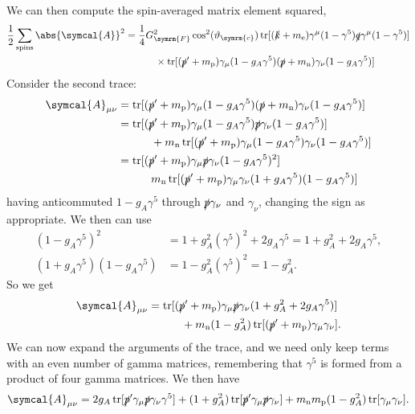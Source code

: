 \documentclass[fleqn]{NotesClass}
\newcommand{\Pparticle}[1]{\mathrm{#1}}
\newcommand{\Pex}{\ensuremath{\Pparticle{e}}}
\newcommand{\Pp}{\ensuremath{\Pparticle{p}}}
\newcommand{\Pn}{\ensuremath{\Pparticle{n}}}
\newcommand{\amplitude}{\symcal{A}}
\DeclareMathOperator{\tr}{tr}
\newcommand{\fermiConst}{G_{\symrm{F}}}
\newcommand{\cabibboangle}{\vartheta_{\symrm{c}}}
\begin{document}
    We can then compute the spin-averaged matrix element squared,
    \begin{align}
        \frac{1}{2} \sum_{\text{spins}} \abs{\amplitude}^2 &= \frac{1}{4}\fermiConst^2\cos^2(\cabibboangle) \tr[(\slashed{k} + m_{\Pex})\gamma^\mu(1 - \gamma^5)\slashed{q}\gamma^\mu(1 - \gamma^5)]\\
        &\quad\qquad \times \tr[(\slashed{p}' + m_{\Pp})\gamma_\mu(1 - g_A\gamma^5)(\slashed{p} + m_{\Pn})\gamma_\nu(1 - g_A\gamma^5)] \notag
    \end{align}
    Consider the second trace:
    \begin{align}
        \amplitude_{\mu\nu} &= \tr[(\slashed{p}' + m_{\Pp})\gamma_\mu(1 - g_A\gamma^5)(\slashed{p} + m_{\Pn})\gamma_\nu(1 - g_A\gamma^5)]\\
        &= \tr[(\slashed{p}' + m_{\Pp})\gamma_\mu(1 - g_A\gamma^5)\slashed{p}\gamma_\nu(1 - g_A\gamma^5)]\\
        &\quad\qquad + m_{\Pn}\tr[(\slashed{p}' + m_{\Pp})\gamma_\mu(1 - g_A\gamma^5)\gamma_\nu(1 - g_A\gamma^5)]\\
        &= \tr[(\slashed{p}' + m_{\Pp})\gamma_\mu\slashed{p}\gamma_\nu(1 - g_A\gamma^5)^2]\\
        &\quad\qquad m_{\Pn}\tr[(\slashed{p}' + m_{\Pp})\gamma_\mu\gamma_\nu(1 + g_A\gamma^5)(1 - g_A\gamma^5)]
    \end{align}
    having anticommuted \(1 - g_A\gamma^5\) through \(\slashed{p}\gamma_\nu\) and \(\gamma_\nu\), changing the sign as appropriate.
    We then can use
    \begin{align}
        (1 - g_A\gamma^5)^2 &= 1 + g_A^2(\gamma^5)^2 + 2g_A\gamma^5 = 1 + g_A^2 + 2g_A\gamma^5,\\
        (1 + g_A\gamma^5)(1 - g_A\gamma^5) &= 1 - g_A^2(\gamma^5)^2 = 1 - g_A^2.
    \end{align}
    So we get
    \begin{align}
        \amplitude_{\mu\nu} &= \tr[(\slashed{p}' + m_{\Pp})\gamma_\mu\slashed{p}\gamma_\nu(1 + g_A^2 + 2g_A\gamma^5)]\\
        &\quad\qquad + m_{\Pn}(1 - g_A^2)\tr[(\slashed{p}' + m_{\Pp})\gamma_\mu\gamma_\nu].
    \end{align}
    We can now expand the arguments of the trace, and we need only keep terms with an even number of gamma matrices, remembering that \(\gamma^5\) is formed from a product of four gamma matrices.
    We then have
    \begin{equation*}
        \amplitude_{\mu\nu} = 2g_A\tr[\slashed{p}'\gamma_\mu\slashed{p}\gamma_\nu\gamma^5] + (1 + g_A^2)\tr[\slashed{p}'\gamma_\mu\slashed{p}\gamma_\nu] + m_{\Pn}m_{\Pp}(1 - g_A^2)\tr[\gamma_\mu\gamma_\nu].
    \end{equation*}
\end{document}
